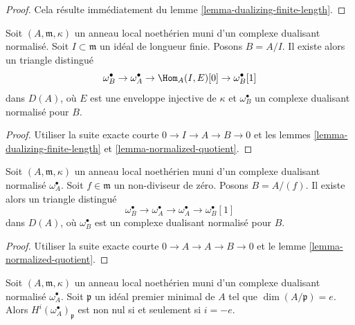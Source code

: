 \begin{proof}
Cela résulte immédiatement du lemme \ref{lemma-dualizing-finite-length}.
\end{proof}

\begin{lemma}
\label{lemma-divide-by-finite-length-ideal}
Soit $(A, \mathfrak m, \kappa)$ un anneau local noethérien muni d'un complexe dualisant normalisé.
Soit $I \subset \mathfrak m$ un idéal de longueur finie. Posons $B = A/I$.
Il existe alors un triangle distingué
$$
\omega_B^\bullet \to \omega_A^\bullet \to \Hom_A(I, E)[0] \to
\omega_B^\bullet[1]
$$
dans $D(A)$, où $E$ est une enveloppe injective de $\kappa$
et $\omega_B^\bullet$ un complexe dualisant normalisé pour $B$.
\end{lemma}

\begin{proof}
Utiliser la suite exacte courte $0 \to I \to A \to B \to 0$
et les lemmes \ref{lemma-dualizing-finite-length} et \ref{lemma-normalized-quotient}.
\end{proof}

\begin{lemma}
\label{lemma-divide-by-nonzerodivisor}
Soit $(A, \mathfrak m, \kappa)$ un anneau local noethérien muni d'un complexe dualisant normalisé $\omega_A^\bullet$.
Soit $f \in \mathfrak m$ un non-diviseur de zéro. Posons $B = A/(f)$.
Il existe alors un triangle distingué
$$
\omega_B^\bullet \to \omega_A^\bullet \to \omega_A^\bullet \to
\omega_B^\bullet[1]
$$
dans $D(A)$, où $\omega_B^\bullet$ est un complexe dualisant normalisé pour $B$.
\end{lemma}

\begin{proof}
Utiliser la suite exacte courte $0 \to A \to A \to B \to 0$ et le lemme \ref{lemma-normalized-quotient}.
\end{proof}

\begin{lemma}
\label{lemma-nonvanishing-generically-local}
Soit $(A, \mathfrak m, \kappa)$ un anneau local noethérien muni d'un complexe dualisant normalisé $\omega_A^\bullet$.
Soit $\mathfrak p$ un idéal premier minimal de $A$ tel que $\dim(A/\mathfrak p) = e$.
Alors $H^i(\omega_A^\bullet)_\mathfrak p$ est non nul si et seulement si $i = -e$.
\end{lemma}

